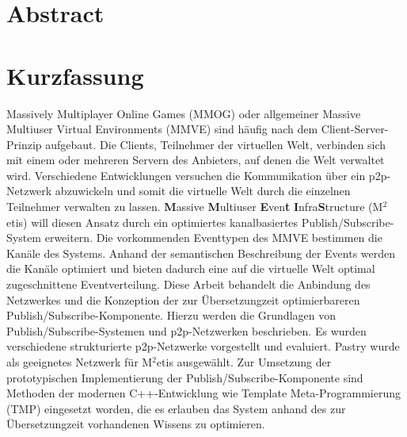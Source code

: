\chapter*{Abstract}


\clearpage{\pagestyle{empty}\cleardoublepage}
\chapter*{Kurzfassung}

Massively Multiplayer Online Games (MMOG) oder allgemeiner Massive Multiuser Virtual Environments (MMVE) sind häufig nach dem Client-Server-Prinzip aufgebaut. Die Clients, Teilnehmer der virtuellen Welt, verbinden sich mit einem oder mehreren Servern des Anbieters, auf denen die Welt verwaltet wird. Verschiedene Entwicklungen versuchen die Kommunikation über ein p2p-Netzwerk abzuwickeln und somit die virtuelle Welt durch die einzelnen Teilnehmer verwalten zu lassen. \textbf{M}assive \textbf{M}ultiuser \textbf{E}ven\textbf{t} \textbf{I}nfra\textbf{S}tructure (M$^2$etis) will diesen Ansatz durch ein optimiertes kanalbasiertes Publish/Subscribe-System erweitern. Die vorkommenden Eventtypen des MMVE bestimmen die Kanäle des Systems. Anhand der semantischen Beschreibung der Events werden die Kanäle optimiert und bieten dadurch eine auf die virtuelle Welt optimal zugeschnittene Eventverteilung. Diese Arbeit behandelt die Anbindung des Netzwerkes und die Konzeption der zur Übersetzungzeit optimierbareren Publish/Subscribe-Komponente. Hierzu werden die Grundlagen von Publish/Subscribe-Systemen und p2p-Netzwerken beschrieben. Es wurden verschiedene strukturierte p2p-Netzwerke vorgestellt und evaluiert. Pastry wurde als geeignetes Netzwerk für M$^2$etis ausgewählt. Zur Umsetzung der prototypischen Implementierung der Publish/Subscribe-Komponente sind Methoden der modernen C++-Entwicklung wie Template Meta-Programmierung (TMP) eingesetzt worden, die es erlauben das System anhand des zur Übersetzungzeit vorhandenen Wissens zu optimieren.

